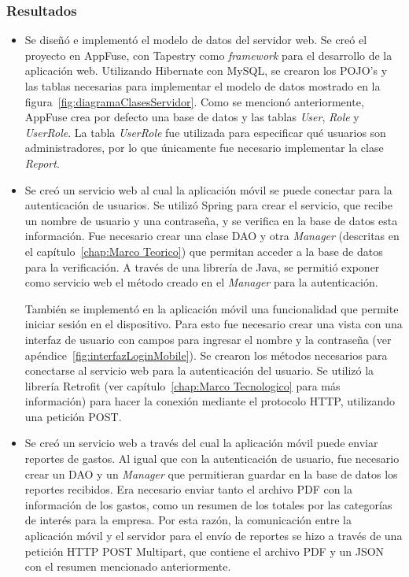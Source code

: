\subsubsection{Resultados}
\begin{itemize}
\item Se diseñó e implementó el modelo de datos del servidor web. Se creó el proyecto en AppFuse, con Tapestry como \textit{framework} para el desarrollo de la aplicación web. Utilizando Hibernate con MySQL, se crearon los POJO's y las tablas necesarias para implementar el modelo de datos mostrado en la figura~\ref{fig:diagramaClasesServidor}. Como se mencionó anteriormente, AppFuse crea por defecto una base de datos y las tablas \textit{User}, \textit{Role} y \textit{UserRole}. La tabla \textit{UserRole} fue utilizada para especificar qué usuarios son administradores, por lo que únicamente fue necesario implementar la clase \textit{Report}.
\item Se creó un servicio web al cual la aplicación móvil se puede conectar para la autenticación de usuarios. Se utilizó Spring para crear el servicio, que recibe un nombre de usuario y una contraseña, y se verifica en la base de datos esta información. Fue necesario crear una clase DAO y otra \textit{Manager} (descritas en el capítulo~\ref{chap:Marco Teorico}) que permitan acceder a la base de datos para la verificación. A través de una librería de Java, se permitió exponer como servicio web el método creado en el \textit{Manager} para la autenticación.

También se implementó en la aplicación móvil una funcionalidad que permite iniciar sesión en el dispositivo. Para esto fue necesario crear una vista con una interfaz de usuario con campos para ingresar el nombre y la contraseña (ver apéndice~\ref{fig:interfazLoginMobile}). Se crearon los métodos necesarios para conectarse al servicio web para la autenticación del usuario. Se utilizó la librería Retrofit (ver capítulo~\ref{chap:Marco Tecnologico} para más información) para hacer la conexión mediante el protocolo HTTP, utilizando una petición POST.
\item Se creó un servicio web a través del cual la aplicación móvil puede enviar reportes de gastos. Al igual que con la autenticación de usuario, fue necesario crear un DAO y un \textit{Manager} que permitieran guardar en la base de datos los reportes recibidos. Era necesario enviar tanto el archivo PDF con la información de los gastos, como un resumen de los totales por las categorías de interés para la empresa. Por esta razón, la comunicación entre la aplicación móvil y el servidor para el envío de reportes se hizo a través de una petición HTTP POST Multipart, que contiene el archivo PDF y un JSON con el resumen mencionado anteriormente.


\end{itemize}
